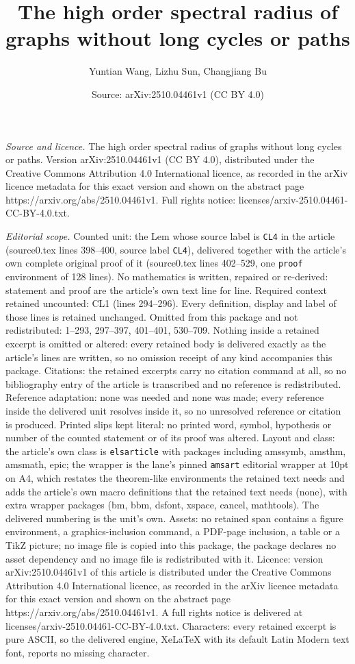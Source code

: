 \documentclass[10pt,a4paper]{amsart}
\title[The high order spectral radius of graphs without long cycles]{The high order spectral radius of graphs without long cycles or paths}
\author{Yuntian Wang, Lizhu Sun, Changjiang Bu}
\date{Source: arXiv:2510.04461v1 (CC BY 4.0)}
\begin{document}
\maketitle

\noindent\emph{Source and licence.} The high order spectral radius of graphs without long cycles or paths. Version arXiv:2510.04461v1 (CC BY 4.0), distributed under the Creative Commons Attribution 4.0 International licence, as recorded in the arXiv licence metadata for this exact version and shown on the abstract page https://arxiv.org/abs/2510.04461v1. Full rights notice: licenses/arxiv-2510.04461-CC-BY-4.0.txt.\par\smallskip

\noindent\textit{Editorial scope.} Counted unit: the Lem whose source label is \texttt{CL4} in the article (source0.tex lines 398--400, source label \texttt{CL4}), delivered together with the article's own complete original proof of it (source0.tex lines 402--529, one \texttt{proof} environment of 128 lines). No mathematics is written, repaired or re-derived: statement and proof are the article's own text line for line. Required context retained uncounted: CL1 (lines 294--296). Every definition, display and label of those lines is retained unchanged. Omitted from this package and not redistributed: 1--293, 297--397, 401--401, 530--709. Nothing inside a retained excerpt is omitted or altered: every retained body is delivered exactly as the article's lines are written, so no omission receipt of any kind accompanies this package. Citations: the retained excerpts carry no citation command at all, so no bibliography entry of the article is transcribed and no reference is redistributed. Reference adaptation: none was needed and none was made; every reference inside the delivered unit resolves inside it, so no unresolved reference or citation is produced. Printed slips kept literal: no printed word, symbol, hypothesis or number of the counted statement or of its proof was altered. Layout and class: the article's own class is \texttt{elsarticle} with packages including amssymb, amsthm, amsmath, epic; the wrapper is the lane's pinned \texttt{amsart} editorial wrapper at 10pt on A4, which restates the theorem-like environments the retained text needs and adds the article's own macro definitions that the retained text needs (none), with extra wrapper packages (bm, bbm, dsfont, xspace, cancel, mathtools). The delivered numbering is the unit's own. Assets: no retained span contains a figure environment, a graphics-inclusion command, a PDF-page inclusion, a table or a TikZ picture; no image file is copied into this package, the package declares no asset dependency and no image file is redistributed with it. Licence: version arXiv:2510.04461v1 of this article is distributed under the Creative Commons Attribution 4.0 International licence, as recorded in the arXiv licence metadata for this exact version and shown on the abstract page https://arxiv.org/abs/2510.04461v1. A full rights notice is delivered at licenses/arxiv-2510.04461-CC-BY-4.0.txt. Characters: every retained excerpt is pure ASCII, so the delivered engine, XeLaTeX with its default Latin Modern text font, reports no missing character.
\end{document}
